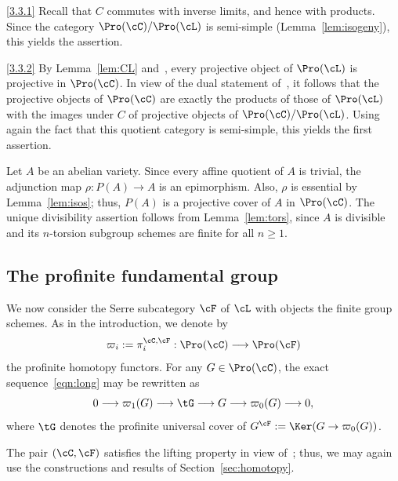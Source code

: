 \begin{proofc}
\begin{step}{\eqref{3.3.1}}%
Recall that $C$ commutes with inverse limits, and hence with products. Since the category $\Pro(\cC)/\Pro(\cL)$ is semi-simple (Lemma~\ref{lem:isogeny}), this yields the assertion.
\end{step}

\begin{laststep}{\eqref{3.3.2}}
By Lemma~\ref{lem:CL} and~\cite[Lem.~2.14]{Br17b}, every projective object of $\Pro(\cL)$ is projective in $\Pro(\cC)$. In view of the dual statement of~\cite[III.3.Cor.~2]{Gabriel}, it follows that the projective objects of $\Pro(\cC)$ are exactly the products of those of $\Pro(\cL)$ with the images under $C$ of projective objects of $\Pro(\cC)/\Pro(\cL)$. Using again the fact that this quotient category is semi-simple, this yields the first assertion.

Let $A$ be an abelian variety. Since every affine quotient of $A$ is trivial, the adjunction map $\rho : P(A) \to A$ is an epimorphism. Also, $\rho$ is essential by Lemma~\ref{lem:isos}; thus, $P(A)$ is a projective cover of $A$ in $\Pro(\cC)$. The unique divisibility assertion follows from Lemma~\ref{lem:tors}, since $A$ is divisible and its $n$-torsion subgroup schemes are finite for all $n \geq 1$.
\end{laststep}
\let\qed\relax
\end{proofc}

\subsection{The profinite fundamental group}\label{subsec:profinite}

We now consider the Serre subcategory $\cF$ of $\cL$ with objects the finite group schemes. As in the introduction, we denote by
\[
\varpi_i := \pi_i^{\cC,\cF} : \Pro(\cC) \longrightarrow \Pro(\cF)
\]
the profinite homotopy functors. For any $G \in \Pro(\cC)$, the exact sequence~\eqref{eqn:long} may be rewritten as
\[
0 \longrightarrow \varpi_1(G) \longrightarrow \tG
\longrightarrow G \longrightarrow \varpi_0(G)
\longrightarrow 0,
\]
where $\tG$ denotes the profinite universal cover of $G^{\cF} := \Ker(G \to \varpi_0(G))$.

The pair $(\cC,\cF)$ satisfies the lifting property in view of~\cite[Thm.~1.1]{Br15}; thus, we may again use the constructions and results of Section~\ref{sec:homotopy}.


